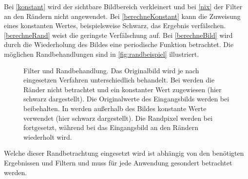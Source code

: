 Bei \autoref{konstant} wird der sichtbare Bildbereich verkleinert und bei \autoref{nix} der Filter an den Rändern nicht
 angewendet. Bei \autoref{berechneKonstant} kann die Zuweisung eines konstanten Wertes, beispielsweise Schwarz, das
 Ergebnis verfälschen. \autoref{berechneRand} weist die geringste Verfälschung auf. Bei \autoref{berechneBild} wird
 durch die Wiederholung des Bildes eine periodische Funktion betrachtet. Die möglichen Randbehandlungen sind in
 \autoref{fig:randbeispiel} illustriert.
\begin{figure}[!ht]
	\centering
	\caption{Filter und Randbehandlung. Das Originalbild  wird je nach eingesetzen
	 Verfahren unterschiedlich behandelt. Bei  werden die Ränder nicht betrachtet und ein
	 konstanter Wert zugewiesen (hier schwarz dargestellt).	Die Originalwerte des Eingangsbilds werden bei
	  beibehalten. In  werden außerhalb des Bildes konstante
	 Werte verwendet (hier schwarz dargestellt). Die Randpixel werden bei  fortgesetzt,
	 während bei  das Eingangsbild an den Rändern wiederholt wird.}
	\label{fig:randbeispiel}
\end{figure}
Welche dieser Randbetrachtung eingesetzt wird ist abhängig von den benötigten Ergebnissen und Filtern und muss für jede
 Anwendung gesondert betrachtet werden.

